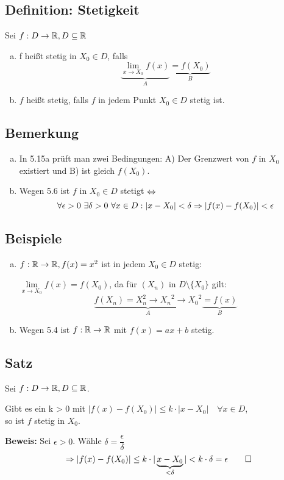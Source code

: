 \documentclass[10pt, a4paper, fleqn]{article}
\begin{document}
\subsection{Definition: Stetigkeit}
Sei $f: D \to \mathbb{R}, D \subseteq \mathbb{R}$
\begin{enumerate}[a)]
    \item f heißt stetig in $X_0 \in D$, falls
    \[
        \underbrace{\lim_{x \to X_0} f(x)}_A \underbrace{= f(X_0)}_B    
    \]
    \item $f$ heißt stetig, falls $f$ in jedem Punkt $X_0 \in D$ stetig ist.
\end{enumerate}

\subsection{Bemerkung}
\begin{enumerate}[a)]
    \item In 5.15a prüft man zwei Bedingungen: A) Der Grenzwert von $f$ in $X_0$ existiert und 
    B) ist gleich $f(X_0)$.

    \item Wegen 5.6 ist $f$ in $X_0 \in D$ stetigt $\Leftrightarrow$
    \[
        \forall \epsilon > 0 \ \exists \delta > 0 \ \forall x \in D: |x-X_0| < \delta
        \imp |f(x) - f(X_0)| < \epsilon    
    \]
\end{enumerate}

\subsection{Beispiele}
\begin{enumerate}[a)] 
    \item $f: \mathbb{R} \to \mathbb{R}, f(x) = x^2$ ist in jedem $X_0 \in D$ stetig:

    $\lim\limits_{x \to X_0} f(x) = f(X_0)$, da für $(X_n)$ in $D \setminus \{X_0\}$ gilt:
    \[
        \underbrace{f(X_n) = X_n^2 \to {X_n}^2 \to {X_0}^2}_{A} \underbrace{= f(x)}_{B}    
    \]
    \item Wegen 5.4 ist $f: \mathbb{R} \to \mathbb{R}$ mit $f(x) = ax + b$ stetig.
\end{enumerate}

\subsection{Satz}
Sei $f: D \to \mathbb{R}, D \subseteq \mathbb{R}$.

Gibt es ein k > 0 mit $|f(x) - f(X_0)| \leq k \cdot |x - X_0| \quad \forall x \in D$, \\
so ist $f$ stetig in $X_0$.

\textbf{Beweis: }
Sei $\epsilon > 0$. Wähle $\delta = \dfrac{\epsilon}{\delta}$
\[
    \Rightarrow |f(x) - f(X_0)| \leq k \cdot |\underbrace{x - X_0}_{< \delta}| < k \cdot \delta = \epsilon \qed   
\]

\ifdefined\MAINDOC\else
\end{document}
